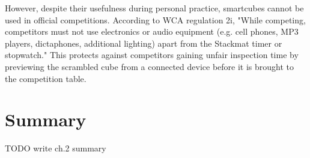 However, despite their usefulness during personal practice, smartcubes
cannot be used in official competitions. According to WCA regulation
2i, "While competing, competitors must not use electronics or audio
equipment (e.g. cell phones, MP3 players, dictaphones, additional
lighting) apart from the Stackmat timer or stopwatch."
\cite{wca-regulations} This protects against competitors gaining unfair
inspection time by previewing the scrambled cube from a connected
device before it is brought to the competition table.

\section{Summary}
TODO write ch.2 summary

